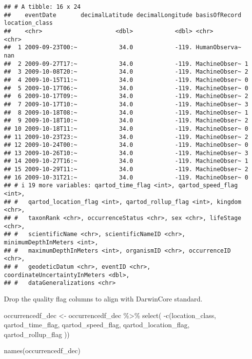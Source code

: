 \documentclass[
]{book}
\newenvironment{Shaded}{\begin{snugshade}}{\end{snugshade}}
\newcommand{\FunctionTok}[1]{\textcolor[rgb]{0.00,0.00,0.00}{#1}}
\newcommand{\NormalTok}[1]{#1}
\newcommand{\OtherTok}[1]{\textcolor[rgb]{0.56,0.35,0.01}{#1}}
\newcommand{\SpecialCharTok}[1]{\textcolor[rgb]{0.00,0.00,0.00}{#1}}
\begin{document}
\begin{verbatim}
## # A tibble: 16 x 24
##    eventDate       decimalLatitude decimalLongitude basisOfRecord location_class
##    <chr>                     <dbl>            <dbl> <chr>         <chr>         
##  1 2009-09-23T00:~            34.0            -119. HumanObserva~ nan           
##  2 2009-09-27T17:~            34.0            -119. MachineObser~ 1             
##  3 2009-10-08T20:~            34.0            -119. MachineObser~ 2             
##  4 2009-10-15T11:~            34.0            -119. MachineObser~ 0             
##  5 2009-10-17T06:~            34.0            -119. MachineObser~ 0             
##  6 2009-10-17T09:~            34.0            -119. MachineObser~ 2             
##  7 2009-10-17T10:~            34.0            -119. MachineObser~ 3             
##  8 2009-10-18T08:~            34.0            -119. MachineObser~ 1             
##  9 2009-10-18T10:~            34.0            -119. MachineObser~ 2             
## 10 2009-10-18T11:~            34.0            -119. MachineObser~ 0             
## 11 2009-10-23T23:~            34.0            -119. MachineObser~ 2             
## 12 2009-10-24T00:~            34.0            -119. MachineObser~ 0             
## 13 2009-10-26T10:~            34.0            -119. MachineObser~ 3             
## 14 2009-10-27T16:~            34.0            -119. MachineObser~ 1             
## 15 2009-10-29T11:~            34.0            -119. MachineObser~ 2             
## 16 2009-10-31T21:~            34.0            -119. MachineObser~ 0             
## # i 19 more variables: qartod_time_flag <int>, qartod_speed_flag <int>,
## #   qartod_location_flag <int>, qartod_rollup_flag <int>, kingdom <chr>,
## #   taxonRank <chr>, occurrenceStatus <chr>, sex <chr>, lifeStage <chr>,
## #   scientificName <chr>, scientificNameID <chr>, minimumDepthInMeters <int>,
## #   maximumDepthInMeters <int>, organismID <chr>, occurrenceID <chr>,
## #   geodeticDatum <chr>, eventID <chr>, coordinateUncertaintyInMeters <dbl>,
## #   dataGeneralizations <chr>
\end{verbatim}

Drop the quality flag columns to align with DarwinCore standard.

\begin{Shaded}
\begin{Highlighting}[]
\NormalTok{occurrencedf\_dec }\OtherTok{\textless{}{-}}\NormalTok{ occurrencedf\_dec }\SpecialCharTok{\%\textgreater{}\%}
    \FunctionTok{select}\NormalTok{(}
        \SpecialCharTok{{-}}\FunctionTok{c}\NormalTok{(location\_class,}
\NormalTok{           qartod\_time\_flag,}
\NormalTok{           qartod\_speed\_flag,}
\NormalTok{           qartod\_location\_flag,}
\NormalTok{           qartod\_rollup\_flag}
\NormalTok{           ))}
        
\FunctionTok{names}\NormalTok{(occurrencedf\_dec)}
\end{Highlighting}
\end{Shaded}
\end{document}
